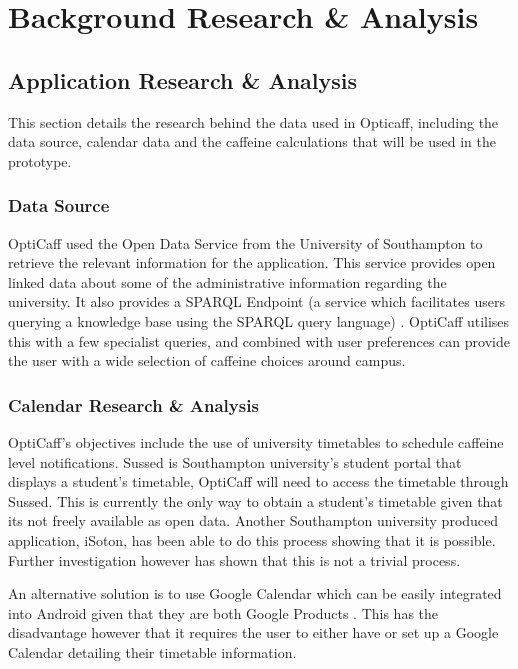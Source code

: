 \section{Background Research \& Analysis}

\subsection{Application Research \& Analysis}
This section details the research behind the data used in Opticaff, including the data source, calendar data and the caffeine calculations that will be used in the prototype. 

\subsubsection{Data Source}
OptiCaff used the Open Data Service from the University of Southampton \cite{DataSouthampton} to retrieve the relevant information for the application. This service provides open linked data about some of the administrative information regarding the university. It also provides a SPARQL Endpoint \cite{SotonSparql} (a service which facilitates users querying a knowledge base using the SPARQL query language) \cite{SparqlEndpoint}. OptiCaff utilises this with a few specialist queries, and combined with user preferences can provide the user with a wide selection of caffeine choices around campus. 

\subsubsection{Calendar Research \& Analysis}
\label{sec:calendar}
OptiCaff’s objectives include the use of university timetables to schedule caffeine level notifications. 
Sussed is Southampton university’s student portal that displays a student’s timetable, OptiCaff will need to access the timetable through Sussed. 
This is currently the only way to obtain a student's timetable given that its not freely available as open data. 
Another Southampton university produced application, iSoton, has been able to do this process showing that it is possible.
Further investigation however has shown that this is not a trivial process.

An alternative solution is to use Google Calendar which can be easily integrated into Android given that they are both Google Products \cite{calendar}.
This has the disadvantage however that it requires the user to either have or set up a Google Calendar detailing their timetable information. 
 
